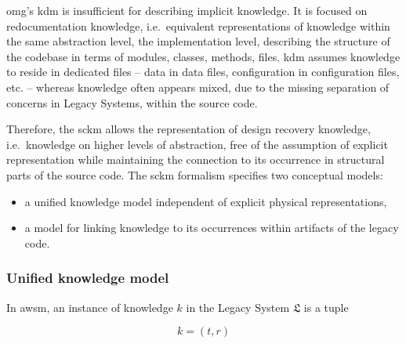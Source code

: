 \gls{omg}'s \gls{kdm} is insufficient for describing implicit knowledge.
It is focused on redocumentation knowledge, i.e.~equivalent representations of knowledge within the same abstraction level, the implementation level, describing the structure of the  codebase in terms of modules, classes, methods, files.
\gls{kdm} assumes knowledge to reside in dedicated files -- data in data files, configuration in configuration files, etc.
-- whereas knowledge often appears mixed, due to the missing separation of concerns in \glspl{Legacy System}, within the source code.

Therefore, the \gls{sckm} allows the representation of design recovery knowledge, i.e.~knowledge on higher levels of abstraction, free of the assumption of explicit representation while maintaining the connection to its occurrence in structural parts of the source code.
The \gls{sckm} formalism specifies two conceptual models:
\begin{itemize}
\item a unified knowledge model independent of explicit physical representations,
\item a model for linking knowledge to its occurrences within artifacts of the legacy code.
\end{itemize}

\vspace{-15pt}
\subsubsection*{Unified knowledge model} 
In \gls{awsm}, an instance of knowledge \(k\) in the \gls{Legacy System} \(\mathfrak{L}\) is a tuple

\begin{equation}k = (t, r)\label{eq:knowledge}\end{equation}


